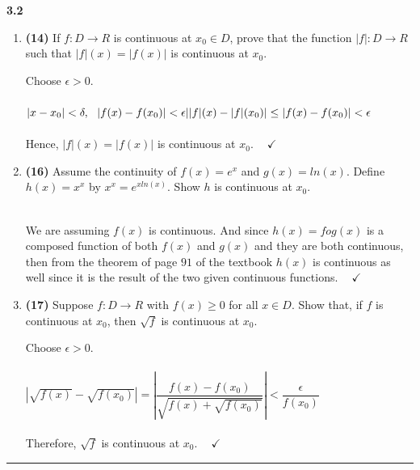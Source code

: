 \documentclass[fleqn]{article}
\begin{document}
  \textbf{3.2}
  \begin{enumerate}
    \item \textbf{(14)} If $f: D \longrightarrow R$ is continuous at $x_0 \in D$, prove that the function $|f|: D \longrightarrow R$
    such that $|f|(x)=|f(x)|$ is continuous at $x_0$.

      \textcolor{hwColor}{
        Choose $\epsilon > 0$.
        \\
        \\
        $
          |x-x_0| < \delta, ~~ |f(x)-f(x_0)| < \epsilon
          \\
          \\
          ||f|(x)-|f|(x_0)| \leq |f(x)-f(x_0)| < \epsilon
        $
        \\
        \\
        Hence, $|f|(x)=|f(x)|$ is continuous at $x_0$. $~~~~ \checkmark$
      }


    \item \textbf{(16)} Assume the continuity of $f(x)=e^x$ and $g(x)=ln(x)$. Define $h(x)=x^x$ by $x^x=e^{x ln(x)}$. Show $h$ is continuous
    at $x_0$.

      \textcolor{hwColor}{
        \\
        We are assuming $f(x)$ is continuous. And since $h(x)=fog(x)$ is a composed function of both $f(x)$ and $g(x)$
        and they are both continuous, then from the theorem of page $91$ of the textbook $h(x)$ is continuous as well since
        it is the result of the two given continuous functions. $~~~~ \checkmark$
        \\ 
      }
    

    \item \textbf{(17)} Suppose $f: D \longrightarrow R$ with $f(x) \geq 0$ for all $x \in D$. Show that, if $f$ is continuous at $x_0$, then
    $\sqrt{f}$ is continuous at $x_0$.

      \textcolor{hwColor}{
        Choose $\epsilon >0$. 
        \\
        \\
        $
          |\sqrt{f(x)}-\sqrt{f(x_0)}|=|\dfrac{f(x)-f(x_0)}{\sqrt{f(x)+\sqrt{f(x_0)}}}| < \dfrac{\epsilon}{f(x_0)}
        $
        \\
        \\
        Therefore, $\sqrt{f}$ is continuous at $x_0$. $~~~~ \checkmark$
      }

  \end{enumerate}

  \rule{15cm}{2pt}
\end{document}
